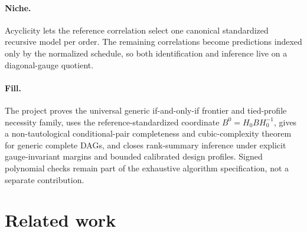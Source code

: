 \documentclass{article}
\begin{document}
\paragraph{Niche.} Acyclicity lets the reference correlation select one canonical standardized recursive model per order. The remaining correlations become predictions indexed only by the normalized schedule, so both identification and inference live on a diagonal-gauge quotient.

\paragraph{Fill.} The project proves the universal generic if-and-only-if frontier and tied-profile necessity family, uses the reference-standardized coordinate \(B^0=H_0BH_0^{-1}\), gives a non-tautological conditional-pair completeness and cubic-complexity theorem for generic complete DAGs, and closes rank-summary inference under explicit gauge-invariant margins and bounded calibrated design profiles. Signed polynomial checks remain part of the exhaustive algorithm specification, not a separate contribution.

\section{Related work}
\end{document}
